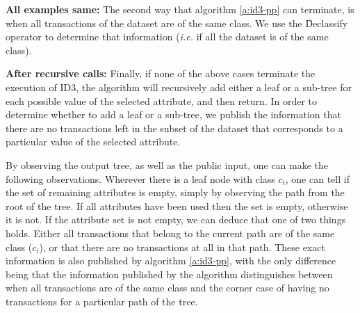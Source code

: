 \textbf{All examples same:}
The second way that algorithm \ref{a:id3-pp} can terminate, is when all transactions of the dataset are of the same class.
We use the \f{Declassify} operator to determine that information (\textit{i.e.} if all the dataset is of the same class).

\textbf{After recursive calls:}
Finally, if none of the above cases terminate the execution of ID3, the algorithm will recursively add either a leaf or a sub\hyp tree for each possible value of the selected attribute, and then return.
In order to determine whether to add a leaf or a sub\hyp tree, we publish the information that there are no transactions left in the subset of the dataset that corresponds to a particular value of the selected attribute.

By observing the output tree, as well as the public input, one can make the following observations.
Wherever there is a leaf node with class $c_i$, one can tell if the set of remaining attributes is empty, simply by observing the path from the root of the tree.
If all attributes have been used then the set is empty, otherwise it is not.
If the attribute set is not empty, we can deduce that one of two things holds.
Either all transactions that belong to the current path are of the same class ($c_i$), or that there are no transactions at all in that path.
These exact information is also published by algorithm \ref{a:id3-pp}, with the only difference being that the information published by the algorithm distinguishes between when all transactions are of the same class and the corner case of having no transactions for a particular path of the tree.


